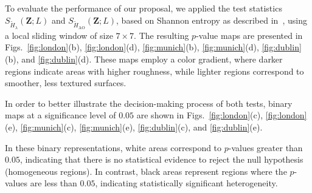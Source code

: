 \documentclass[
  journal,
]{IEEEtran}%
\begin{document}
\begin{table}[hbt]
\centering\centering
\caption{\label{tab:table_param}Parameters of selected SAR images.}
\end{table}

To evaluate the performance of our proposal, we applied the test
statistics \(S_{\widetilde{H}_{\lambda}}(\bm{Z}; L)\) and
\(S_{\widetilde{H}_{\text{AO}}}(\bm{Z}; L)\), based on Shannon entropy
as described in~, using a local
sliding window of size \(7\times7\). The resulting \(p\)-value maps are
presented in Figs.~\ref{fig:london}(b), \ref{fig:london}(d),
\ref{fig:munich}(b), \ref{fig:munich}(d), \ref{fig:dublin}(b), and
\ref{fig:dublin}(d). These maps employ a color gradient, where darker
regions indicate areas with higher roughness, while lighter regions
correspond to smoother, less textured surfaces.

In order to better illustrate the decision-making process of both tests,
binary maps at a significance level of \(0.05\) are shown in
Figs.~\ref{fig:london}(c), \ref{fig:london}(e), \ref{fig:munich}(c),
\ref{fig:munich}(e), \ref{fig:dublin}(c), and \ref{fig:dublin}(e).

In these binary representations, white areas correspond to \(p\)-values
greater than \(0.05\), indicating that there is no statistical evidence
to reject the null hypothesis (homogeneous regions). In contrast, black
areas represent regions where the \(p\)-values are less than \(0.05\),
indicating statistically significant heterogeneity.
\end{document}
